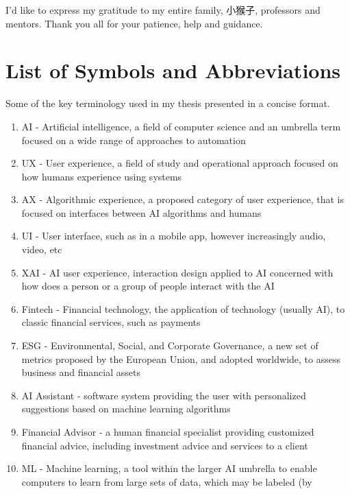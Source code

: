 \documentclass[
  12pt,
  letterpaper,
  DIV=11,
  numbers=noendperiod]{scrartcl}
\let\SavedLoT\listoftables
\renewcommand{\listoftables}{}\KOMAoption{captions}{tableheading}
\begin{document}
I'd like to express my gratitude to my entire family, 小猴子, professors
and mentors. Thank you all for your patience, help and guidance.

\newpage

\tableofcontents
\clearpage 
\listoffigures
\clearpage 
\SavedLoT

\newpage

\section{List of Symbols and
Abbreviations}\label{list-of-symbols-and-abbreviations}

Some of the key terminology used in my thesis presented in a concise
format.

\begin{enumerate}
\def\labelenumi{\arabic{enumi}.}
\item
  AI - Artificial intelligence, a field of computer science and an
  umbrella term focused on a wide range of approaches to automation
\item
  UX - User experience, a field of study and operational approach
  focused on how humans experience using systems
\item
  AX - Algorithmic experience, a proposed category of user experience,
  that is focused on interfaces between AI algorithms and humans
\item
  UI - User interface, such as in a mobile app, however increasingly
  audio, video, etc
\item
  XAI - AI user experience, interaction design applied to AI concerned
  with how does a person or a group of people interact with the AI
\item
  Fintech - Financial technology, the application of technology (usually
  AI), to classic financial services, such as payments
\item
  ESG - Environmental, Social, and Corporate Governance, a new set of
  metrics proposed by the European Union, and adopted worldwide, to
  assess business and financial assets
\item
  AI Assistant - software system providing the user with personalized
  suggestions based on machine learning algorithms
\item
  Financial Advisor - a human financial specialist providing customized
  financial advice, including investment advice and services to a client
\item
  ML - Machine learning, a tool within the larger AI umbrella to enable
  computers to learn from large sets of data, which may be labeled (by

\end{enumerate}
\end{document}

